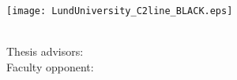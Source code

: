 
\frontmatter %

\thispagestyle{empty} %
\begin{center}
  \vspace*{5cm}
  {\Large \myMainTitle}
\end{center}



\cleardoublepage
\thispagestyle{empty} %
~
\vfill
\begin{center}
  {\HUGE \myMainTitle}
  \\[2mm]
  {\huge \mySubTitle}

  \vfill
  {\myName}

  \vfill
  \texttt{[image: LundUniversity\_C2line\_BLACK.eps]}

  \vspace{10mm}
  {\large \myDegree}\\
  {\large Thesis advisors: \myAdvisors}\\
  {\large Faculty opponent: \myOpponent}\\
  \vspace{1cm}
  {\footnotesize
    \myDefenceAnnouncement
  }
  \\
\end{center}
\vfill

\newpage





